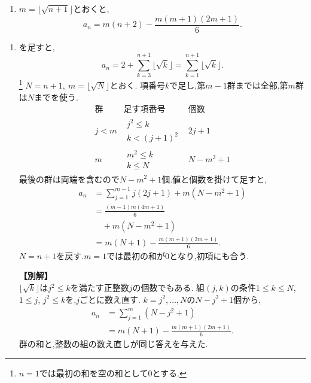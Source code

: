 \noindent {}\par\nobreak
\begin{enumerate}[label=(\arabic*),parsep=3pt,beginpenalty=10000,format=\bookitemlink{example-gauss-role-2}{answer}{problem}]
  \item $m=\lfloor\sqrt{n+1}\rfloor$とおくと,
    \[
      a_n=m(n+2)-\frac{m(m+1)(2m+1)}6.
    \]
\end{enumerate}

\noindent {}\par\nobreak
\begin{enumerate}[label=(\arabic*),parsep=3pt,beginpenalty=10000,format=\bookitemlink{example-gauss-role-2}{solution}{problem}]
  \item {}を足すと,
    \[
      a_n=2+\sum_{k=3}^{n+1}\lfloor\sqrt k\rfloor
      =\sum_{k=1}^{n+1}\lfloor\sqrt k\rfloor.
    \]\footnote{$n=1$では最初の和を空の和として0とする.}
    $N=n+1,\ m=\lfloor\sqrt N\rfloor$とおく.
    項番号$k$で足し,第$m-1$群までは全部,第$m$群は$N$までを使う.
    \[
      \begin{array}{c|c|c}
        \text{群}&\text{足す項番号}&\text{個数}\\ \hline
        j<m&\substack{j^2\le k\\ k<(j+1)^2}&2j+1\\
        m&\substack{m^2\le k\\ k\le N}&N-m^2+1
      \end{array}
    \]
    最後の群は両端を含むので$N-m^2+1$個.値と個数を掛けて足すと,
    \begin{align*}
      a_n&=\sum_{j=1}^{m-1}j(2j+1)+m(N-m^2+1)\\
      &=\frac{(m-1)m(4m+1)}6\\
      &\quad+m(N-m^2+1)\\
      &=m(N+1)-\frac{m(m+1)(2m+1)}6.
    \end{align*}
    $N=n+1$を戻す.$m=1$では最初の和が0となり,初項にも合う.

    \noindent \textbf{【別解】}\\
    $\lfloor\sqrt k\rfloor$は$j^2\le k$を満たす正整数$j$の個数でもある.
    組$(j,k)$の条件$1\le k\le N$, $1\le j$, $j^2\le k$を,$j$ごとに数え直す.
    $k=j^2,\ldots,N$の$N-j^2+1$個から,
    \begin{align*}
      a_n&=\sum_{j=1}^{m}(N-j^2+1)\\
      &=m(N+1)-\frac{m(m+1)(2m+1)}6.
    \end{align*}
    群の和と,整数の組の数え直しが同じ答えを与えた.
\end{enumerate}
